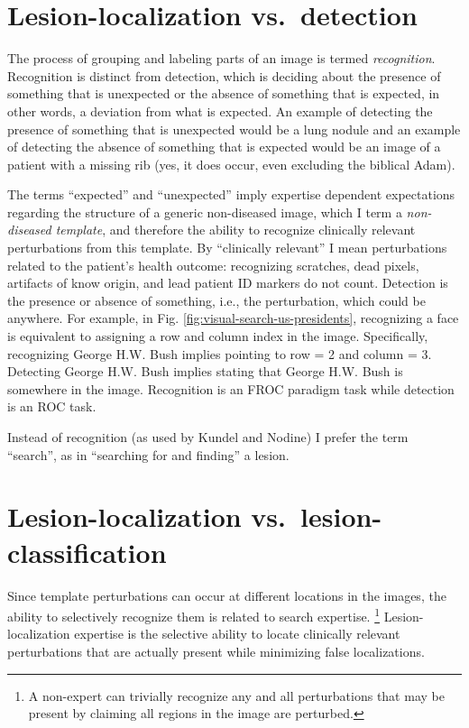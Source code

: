 \documentclass[
]{book}
\begin{document}
\hypertarget{visual-search-recognition-detection}{%
\section{Lesion-localization vs.~detection}\label{visual-search-recognition-detection}}

The process of grouping and labeling parts of an image is termed \emph{recognition}. Recognition is distinct from detection, which is deciding about the presence of something that is unexpected or the absence of something that is expected, in other words, a deviation from what is expected. An example of detecting the presence of something that is unexpected would be a lung nodule and an example of detecting the absence of something that is expected would be an image of a patient with a missing rib (yes, it does occur, even excluding the biblical Adam).

The terms ``expected'' and ``unexpected'' imply expertise dependent expectations regarding the structure of a generic non-diseased image, which I term a \emph{non-diseased template}, and therefore the ability to recognize clinically relevant perturbations from this template. By ``clinically relevant'' I mean perturbations related to the patient's health outcome: recognizing scratches, dead pixels, artifacts of know origin, and lead patient ID markers do not count. Detection is the presence or absence of something, i.e., the perturbation, which could be anywhere. For example, in Fig. \ref{fig:visual-search-us-presidents}, recognizing a face is equivalent to assigning a row and column index in the image. Specifically, recognizing George H.W. Bush implies pointing to row = 2 and column = 3. Detecting George H.W. Bush implies stating that George H.W. Bush is somewhere in the image. Recognition is an FROC paradigm task while detection is an ROC task.

Instead of recognition (as used by Kundel and Nodine) I prefer the term ``search'', as in ``searching for and finding'' a lesion.

\hypertarget{visual-search-search-classification}{%
\section{Lesion-localization vs.~lesion-classification}\label{visual-search-search-classification}}

Since template perturbations can occur at different locations in the images, the ability to selectively recognize them is related to search expertise. \footnote{A non-expert can trivially recognize any and all perturbations that may be present by claiming all regions in the image are perturbed.} Lesion-localization expertise is the selective ability to locate clinically relevant perturbations that are actually present while minimizing false localizations.
\end{document}
